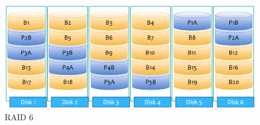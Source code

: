 \documentclass[12pt]{article}
\begin{document}
\begin{itemize}
    \begin{figure}
        \centering
        \includegraphics[width=15cm]{Assignment-14/Raid_6.png}
        \caption{RAID 6}
    \end{figure}
\end{itemize}
\end{document}
